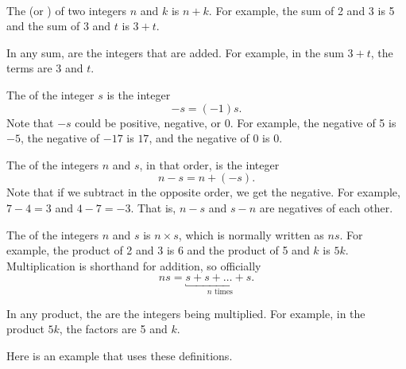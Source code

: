 \begin{defn} 
\label{defn_sum_product}
    ~
    \begin{apart}
        \item The  (or ) of two integers $n$ and $k$ is $n+k$. For example, the sum of 2 and 3 is 5 and the sum of 3 and $t$ is $3+t$. 
        
        \item In any sum,  are the integers that are added. For example, in the sum $3+t$, the terms are 3 and $t$.
        
        \item The  of the integer $s$ is the integer $$-s=(-1)s.$$ Note that $-s$ could be positive, negative, or 0. For example, the negative of 5 is $-5$, the negative of $-17$ is $17$, and the negative of 0 is 0.  
        
        \item The  of the integers $n$ and $s$, in that order, is the integer $$n-s=n+(-s).$$  Note that if we subtract in the opposite order, we get the negative.  For example, $7-4=3$ and $4-7=-3$.  That is, $n-s$ and $s-n$ are negatives of each other.
        
        \item The  of the integers $n$ and $s$ is $n \times s$, which is normally written as $ns$.  For example, the product of 2 and 3 is 6 and the product of 5 and $k$ is $5k$. Multiplication is shorthand for addition, so officially 
        $$ns = \underbracket{s+s+\ldots+s.}_{n \text{ times}}$$

        \item In any product, the  are the integers being multiplied. For example, in the product $5k$, the factors are 5 and $k$.
    \end{apart}
\end{defn}

Here is an example that uses these definitions.

